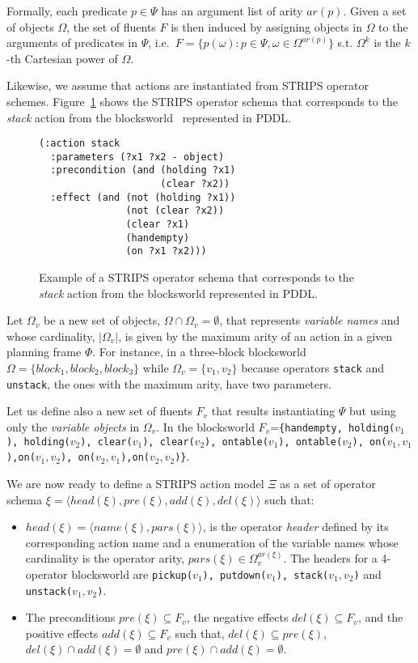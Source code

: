 \documentclass[letterpaper]{article} %
\newcommand{\tup}[1]{{\langle #1 \rangle}}
\begin{document}
Formally, each predicate $p\in\Psi$ has an argument list of arity $ar(p)$. Given a set of objects $\Omega$, the set of fluents $F$ is then induced by assigning objects in $\Omega$ to the arguments of predicates in $\Psi$, i.e.~$F=\{p(\omega):p\in\Psi,\omega\in\Omega^{ar(p)}\}$ s.t. $\Omega^k$ is the $k$-th Cartesian power of $\Omega$.

Likewise, we assume that actions are instantiated from STRIPS operator schemes. Figure~\ref{fig:stack} shows the STRIPS operator schema that corresponds to the {\em stack} action from the blocksworld~\cite{slaney2001blocks} represented in PDDL.
\begin{figure}[hbt]
\begin{footnotesize}
\begin{verbatim}
(:action stack
  :parameters (?x1 ?x2 - object)
  :precondition (and (holding ?x1) 
                     (clear ?x2))
  :effect (and (not (holding ?x1)) 
               (not (clear ?x2))
               (clear ?x1) 
               (handempty) 
               (on ?x1 ?x2)))
\end{verbatim}
\end{footnotesize}
 \caption{\small Example of a STRIPS operator schema that corresponds to the {\em stack} action from the blocksworld represented in PDDL.}
\label{fig:stack}
\end{figure}

Let $\Omega_v$ be a new set of objects, $\Omega\cap\Omega_v=\emptyset$, that represents {\em variable names} and whose cardinality, $|\Omega_v|$, is given by the maximum arity of an action in a given planning frame $\Phi$. For instance, in a three-block blocksworld $\Omega=\{block_1, block_2, block_3\}$ while $\Omega_v=\{v_1, v_2\}$ because operators {\small\tt stack} and {\small\tt unstack}, the ones with the maximum arity, have two parameters.

Let us define also a new set of fluents $F_{v}$ that results instantiating $\Psi$ but using only the {\em variable objects} in $\Omega_v$. In the blocksworld $F_v$={\small\tt\{handempty, holding($v_1$), holding($v_2$), clear($v_1$), clear($v_2$), ontable($v_1$), ontable($v_2$), on($v_1,v_1$),on($v_1,v_2$), on($v_2,v_1$),on($v_2,v_2$)\}}.

We are now ready to define a STRIPS action model $\Xi$ as a set of operator schema $\xi=\tup{head(\xi),pre(\xi),add(\xi),del(\xi)}$ such that:
\begin{itemize}
\item $head(\xi)=\tup{name(\xi),pars(\xi)}$, is the operator {\em header} defined by its corresponding action name and a enumeration of the variable names whose cardinality is the operator arity, $pars(\xi)\in\Omega_v^{ar(\xi)}$. The headers for a 4-operator blocksworld are {\small\tt pickup($v_1$), putdown($v_1$), stack($v_1,v_2$)} and {\small\tt unstack($v_1,v_2$)}.
\item The preconditions $pre(\xi)\subseteq F_v$, the negative effects $del(\xi)\subseteq F_v$, and the positive effects $add(\xi)\subseteq F_v$ such that, $del(\xi)\subseteq pre(\xi)$, $del(\xi)\cap add(\xi)=\emptyset$ and $pre(\xi)\cap add(\xi)=\emptyset$.
\end{itemize}
\end{document}
